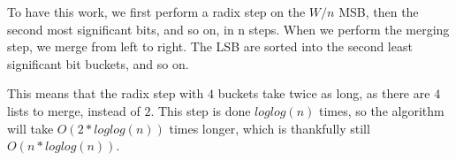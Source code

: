 \documentclass[a4paper,10pt,titlepage]{article}
\begin{document}
To have this work, we first perform a radix step on the $W/n$ MSB, then the second most significant bits, and so on, in n steps. When we perform the merging step, we merge from left to right. The LSB are sorted into the second least significant bit buckets, and so on.

This means that the radix step with $4$ buckets take twice as long, as there are $4$ lists to merge, instead of $2$. This step is done $loglog(n)$ times, so the algorithm will take $O(2*loglog(n))$ times longer, which is thankfully still $O(n*loglog(n))$.
\end{document}
